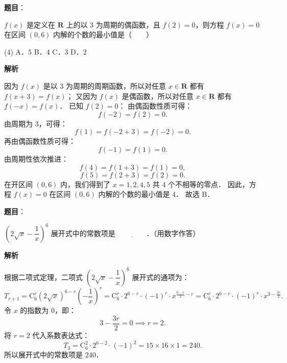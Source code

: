 \begin{answer}

\textbf{题目}：

$f(x)$ 是定义在 $\mathbf{R}$ 上的以 $3$ 为周期的偶函数，且 $f(2) = 0$，则方程 $f(x) = 0$ 在区间 $(0, 6)$ 内解的个数的最小值是\mbox{（　　）}

\begin{gkopts}(4)
\task A．$5$
\task B．$4$
\task C．$3$
\task D．$2$
\end{gkopts}

\textbf{解析}

因为 $f(x)$ 是以 3 为周期的周期函数，所以对任意 $x \in \mathbf{R}$ 都有 $f(x + 3) = f(x)$；
又因为 $f(x)$ 是偶函数，所以对任意 $x \in \mathbf{R}$ 都有 $f(-x) = f(x)$．
已知 $f(2) = 0$：
由偶函数性质可得：
\nopagebreak[4]
\[
f(-2) = f(2) = 0.
\]
由周期为 3，可得：
\nopagebreak[4]
\[
f(1) = f(-2 + 3) = f(-2) = 0.
\]
再由偶函数性质可得：
\nopagebreak[4]
\[
f(-1) = f(1) = 0.
\]
由周期性依次推进：
\nopagebreak[4]
\[
f(4) = f(1 + 3) = f(1) = 0,
\]
\nopagebreak[4]
\[
f(5) = f(2 + 3) = f(2) = 0.
\]
在开区间 $(0, 6)$ 内，我们得到了 $x = 1, 2, 4, 5$ 共 4 个不相等的零点．
因此，方程 $f(x) = 0$ 在区间 $(0, 6)$ 内解的个数的最小值是 4．
故选 B．


\end{answer}
\begin{answer}

\textbf{题目}：

$\left(2\sqrt{x} - \dfrac{1}{x}\right)^6$ 展开式中的常数项是 $\underline{\qquad\qquad}$．（用数字作答）

\textbf{解析}

根据二项式定理，二项式 $\left(2\sqrt{x} - \dfrac{1}{x}\right)^6$ 展开式的通项为：
\nopagebreak[4]
\[
T_{r+1} = \mathrm{C}_6^r (2\sqrt{x})^{6-r} \left(-\frac{1}{x}\right)^r = \mathrm{C}_6^r \cdot 2^{6-r} \cdot (-1)^r \cdot x^{\frac{6-r}{2} - r} = \mathrm{C}_6^r \cdot 2^{6-r} \cdot (-1)^r \cdot x^{3 - \frac{3r}{2}}.
\]
令 $x$ 的指数为 0，即：
\nopagebreak[4]
\[
3 - \frac{3r}{2} = 0 \implies r = 2.
\]
将 $r = 2$ 代入系数表达式：
\nopagebreak[4]
\[
T_3 = \mathrm{C}_6^2 \cdot 2^{6-2} \cdot (-1)^2 = 15 \times 16 \times 1 = 240.
\]
所以展开式中的常数项是 240．


\end{answer}
